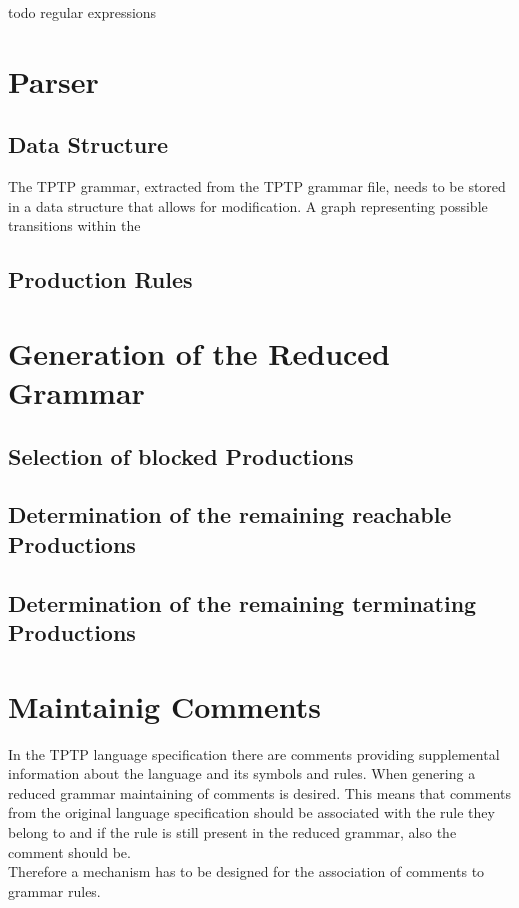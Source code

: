 todo regular expressions
\section{Parser}
\subsection{Data Structure}
The \ac{TPTP} grammar, extracted from the \ac{TPTP} grammar file, needs to be stored in a data structure that allows for modification. A graph representing
possible transitions within the 

\subsection{Production Rules}
\section{Generation of the Reduced Grammar}\label{sec:ConceptGenerateReducedGrammar}

\subsection{Selection of blocked Productions}

\subsection{Determination of the remaining reachable Productions}

\subsection{Determination of  the remaining terminating Productions}

\section{Maintainig Comments}\label{sec:ConceptMaintaining Comments}
In the \ac{TPTP} language specification there are comments providing supplemental information about the language and its symbols and rules.
When genering a reduced grammar maintaining of comments is desired. This means that comments from the original language specification should be associated with the rule they belong to and if the rule is still present in the reduced grammar, also the comment should be.\\
Therefore a mechanism has to be designed for the association of comments to grammar rules.

